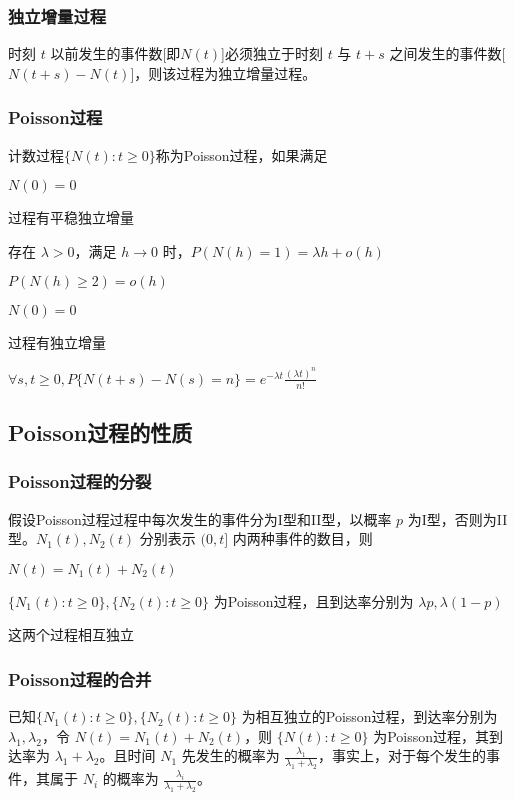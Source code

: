 \documentclass[./main.tex]{subfiles}
\begin{document}
\subsubsection{独立增量过程}
 时刻 $t$ 以前发生的事件数[即$N(t)$]必须独立于时刻 $t$ 与 $t+s$ 之间发生的事件数[$N(t+s)-N(t)$]，则该过程为独立增量过程。
\subsubsection{Poisson过程}
计数过程$\{N(t):t\ge 0\}$称为Poisson过程，如果满足
\begin{enumerate*}
    \item $N(0)=0$
    \item 过程有平稳独立增量
    \item 存在 $\lambda>0$，满足 $h\rightarrow 0$ 时，$P(N(h)=1)=\lambda h+o(h)$
    \item $P(N(h)\ge 2)=o(h)$
\end{enumerate*}
\begin{enumerate*}
    \item $N(0)=0$
    \item 过程有独立增量
    \item $\forall s,t\ge 0,P\{N(t+s)-N(s)=n\}=e^{-\lambda t}\frac{(\lambda t)^n}{n!}$
\end{enumerate*}
\subsection{Poisson过程的性质}
\subsubsection{Poisson过程的分裂}
假设Poisson过程过程中每次发生的事件分为I型和II型，以概率 $p$ 为I型，否则为II型。$N_1(t),N_2(t)$ 分别表示 $(0,t]$ 内两种事件的数目，则
\begin{enumerate*}
    \item $N(t)=N_1(t)+N_2(t)$
    \item $\{N_1(t):t\ge 0\},\{N_2(t):t\ge 0\}$ 为Poisson过程，且到达率分别为 $\lambda p,\lambda(1-p)$
    \item 这两个过程相互独立
\end{enumerate*}
\subsubsection{Poisson过程的合并}
已知$\{N_1(t):t\ge 0\},\{N_2(t):t\ge 0\}$ 为相互独立的Poisson过程，到达率分别为 $\lambda_1,\lambda_2$，令 $N(t)=N_1(t)+N_2(t)$，则 $\{N(t):t\ge 0\}$ 为Poisson过程，其到达率为 $\lambda_1+\lambda_2$。且时间 $N_1$ 先发生的概率为 $\frac{\lambda_1}{\lambda_1+\lambda_2}$，事实上，对于每个发生的事件，其属于 $N_i$ 的概率为 $\frac{\lambda_i}{\lambda_1+\lambda_2}$。
\end{document}
